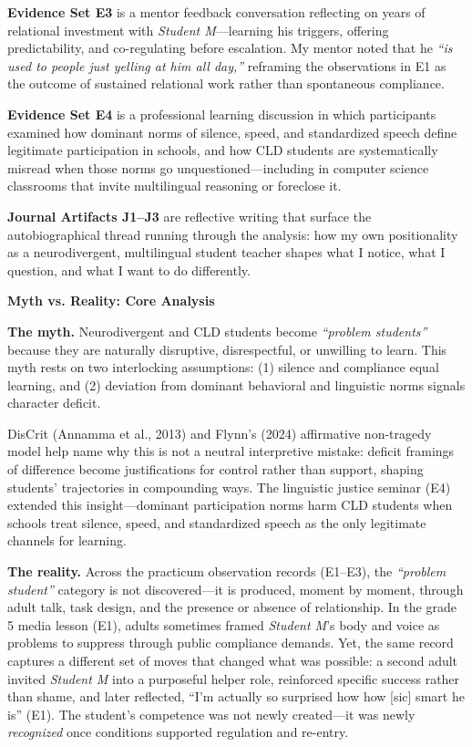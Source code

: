 \documentclass[12pt]{article}
\newcommand{\apaheading}[1]{\begin{center}\textbf{#1}\end{center}}
\newcommand{\EvidenceSet}[1]{\textsc{E#1}}
\newcommand{\JournalArtifact}[1]{\textsc{J#1}}
\begin{document}
\textbf{Evidence Set \EvidenceSet{3}} is a mentor feedback conversation reflecting on years of relational investment with \textit{Student M}---learning his triggers, offering predictability, and co-regulating before escalation. My mentor noted that he \textit{``is used to people just yelling at him all day,''} reframing the observations in \EvidenceSet{1} as the outcome of sustained relational work rather than spontaneous compliance.

\textbf{Evidence Set \EvidenceSet{4}} is a professional learning discussion in which participants examined how dominant norms of silence, speed, and standardized speech define legitimate participation in schools, and how CLD students are systematically misread when those norms go unquestioned---including in computer science classrooms that invite multilingual reasoning or foreclose it.

\textbf{Journal Artifacts \JournalArtifact{1}--\JournalArtifact{3}} are reflective writing that surface the autobiographical thread running through the analysis: how my own positionality as a neurodivergent, multilingual student teacher shapes what I notice, what I question, and what I want to do differently.


\newpage
\apaheading{Myth vs. Reality: Core Analysis}

\textbf{The myth.} Neurodivergent and CLD students become \textit{``problem students''} because they are naturally disruptive, disrespectful, or unwilling to learn. This myth rests on two interlocking assumptions: (1) silence and compliance equal learning, and (2) deviation from dominant behavioral and linguistic norms signals character deficit.

DisCrit (Annamma et al., 2013) and Flynn's (2024) affirmative non-tragedy model help name why this is not a neutral interpretive mistake: deficit framings of difference become justifications for control rather than support, shaping students' trajectories in compounding ways. The linguistic justice seminar (\EvidenceSet{4}) extended this insight---dominant participation norms harm CLD students when schools treat silence, speed, and standardized speech as the only legitimate channels for learning.

\textbf{The reality.} Across the practicum observation records (\EvidenceSet{1}--\EvidenceSet{3}), the \textit{``problem student''} category is not discovered---it is produced, moment by moment, through adult talk, task design, and the presence or absence of relationship. In the grade 5 media lesson (\EvidenceSet{1}), adults sometimes framed \textit{Student M}'s body and voice as problems to suppress through public compliance demands. Yet, the same record captures a different set of moves that changed what was possible: a second adult invited \textit{Student M} into a purposeful helper role, reinforced specific success rather than shame, and later reflected, ``I'm actually so surprised how how [sic] smart he is'' (\EvidenceSet{1}). The student's competence was not newly created---it was newly \textit{recognized} once conditions supported regulation and re-entry.
\end{document}
